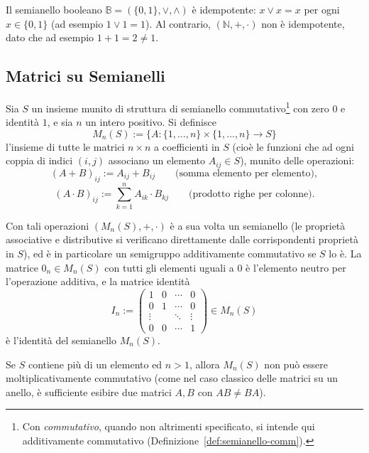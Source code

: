 \begin{rema}
Il semianello booleano $\mathbb{B}=(\{0,1\},\vee,\wedge)$ è idempotente: $x\vee x = x$ per ogni $x\in\{0,1\}$ (ad esempio $1\vee 1=1$). Al contrario, $(\mathbb{N},+,\cdot)$ non è idempotente, dato che ad esempio $1+1=2\neq 1$.
\end{rema}

\subsection{Matrici su Semianelli}

\begin{defi}\label{def:Mn}
Sia $S$ un insieme munito di struttura di semianello commutativo\footnote{Con \emph{commutativo}, quando non altrimenti specificato, si intende qui additivamente commutativo (Definizione~\ref{def:semianello-comm}).} con zero $0$ e identità $1$, e sia $n$ un intero positivo. Si definisce
\[M_n(S) := \{ A : \{1,\dots,n\}\times\{1,\dots,n\} \to S \}\]
l'insieme di tutte le matrici $n\times n$ a coefficienti in $S$ (cioè le funzioni che ad ogni coppia di indici $(i,j)$ associano un elemento $A_{ij}\in S$), munito delle operazioni:
\[(A+B)_{ij} := A_{ij}+B_{ij} \qquad \text{(somma elemento per elemento)},\]
\[(A\cdot B)_{ij} := \sum_{k=1}^n A_{ik}\cdot B_{kj} \qquad \text{(prodotto righe per colonne)}.\]
\end{defi}

Con tali operazioni $(M_n(S),+,\cdot)$ è a sua volta un semianello (le proprietà associative e distributive si verificano direttamente dalle corrispondenti proprietà in $S$), ed è in particolare un semigruppo additivamente commutativo se $S$ lo è. La matrice $0_n\in M_n(S)$ con tutti gli elementi uguali a $0$ è l'elemento neutro per l'operazione additiva, e la matrice identità
\[I_n := \begin{pmatrix} 1 & 0 & \cdots & 0 \\ 0 & 1 & \cdots & 0 \\ \vdots & & \ddots & \vdots \\ 0 & 0 & \cdots & 1 \end{pmatrix} \in M_n(S)\]
è l'identità del semianello $M_n(S)$.

Se $S$ contiene più di un elemento ed $n>1$, allora $M_n(S)$ non può essere moltiplicativamente commutativo (come nel caso classico delle matrici su un anello, è sufficiente esibire due matrici $A,B$ con $AB\neq BA$).

